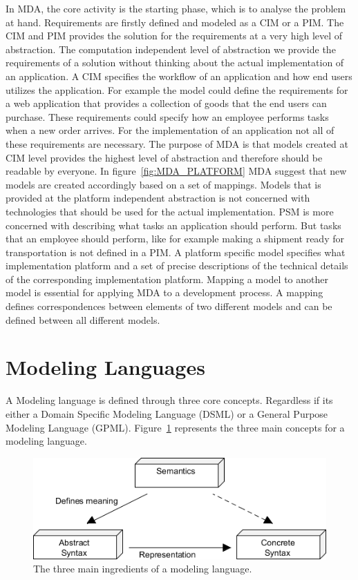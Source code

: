 In MDA, the core activity is the starting phase, which is to analyse the
problem at hand. Requirements are firstly defined and modeled as a CIM or a PIM.
The CIM and PIM provides the solution for the requirements at a very high level
of abstraction. The computation independent level of abstraction we provide
the requirements of a solution without thinking about the actual implementation
of an application. A CIM specifies the workflow of an application and how end
users utilizes the application. For example the model could define the
requirements for a web application that provides a collection of goods that the end users can purchase.
These requirements could specify how an employee performs tasks when a new order
arrives. For the implementation of an application not all of these requirements
are necessary. The purpose of MDA is that models created at
CIM level provides the highest level of abstraction and therefore should be
readable by everyone. In figure~\ref{fig:MDA_PLATFORM} MDA suggest
that new models are created accordingly based on a set of mappings. Models that
is provided at the platform independent abstraction is not concerned with
technologies that should be used for the actual implementation. PSM is more
concerned with describing what tasks an application should perform. But tasks
that an employee should perform, like for example making a shipment ready for
transportation is not defined in a PIM. A platform specific model specifies what
implementation platform and a set of precise descriptions of the technical
details of the corresponding implementation platform. Mapping a model to another
model is essential for applying MDA to a development process. A mapping defines
correspondences between elements of two different models and can be defined
between all different models.

\section{Modeling Languages}

A Modeling language is defined through three core concepts. Regardless if its
either a Domain Specific Modeling Language (DSML) or a General Purpose Modeling
Language (GPML). Figure~\ref{fig:modeling_language} represents the three main
concepts for a modeling language.

\begin{figure}[H]
	\centering
	\includegraphics[scale=0.7]{./Figures/modeling_language.png}
	\caption[Main ingredients of a modeling lanugage.]
	{The three main ingredients of a modeling language.}
	\label{fig:modeling_language}
\end{figure}

